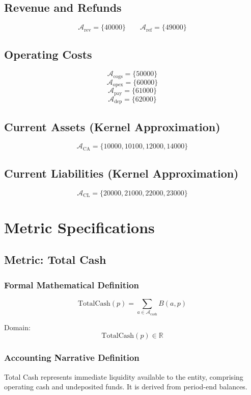 \documentclass[11pt]{article}
\newcommand{\AccountSet}[1]{\mathcal{A}_{\text{#1}}}
\newcommand{\Balance}{B}
\newcommand{\Period}{p}
\newcommand{\Real}{\mathbb{R}}
\begin{document}
\subsection{Revenue and Refunds}
\[
\AccountSet{rev} = \{40000\}
\qquad
\AccountSet{ref} = \{49000\}
\]

\subsection{Operating Costs}
\[
\AccountSet{cogs} = \{50000\}
\]
\[
\AccountSet{opex} = \{60000\}
\]
\[
\AccountSet{pay} = \{61000\}
\]
\[
\AccountSet{dep} = \{62000\}
\]

\subsection{Current Assets (Kernel Approximation)}
\[
\AccountSet{CA} = \{10000, 10100, 12000, 14000\}
\]

\subsection{Current Liabilities (Kernel Approximation)}
\[
\AccountSet{CL} = \{20000, 21000, 22000, 23000\}
\]

\section{Metric Specifications}

\subsection{Metric: Total Cash}

\subsubsection*{Formal Mathematical Definition}
\[
\text{TotalCash}(\Period)
= \sum_{a \in \AccountSet{cash}} \Balance(a, \Period)
\]

Domain:
\[
\text{TotalCash}(\Period) \in \Real
\]

\subsubsection*{Accounting Narrative Definition}
Total Cash represents immediate liquidity available to the entity,
comprising operating cash and undeposited funds.
It is derived from period-end balances.
\end{document}
